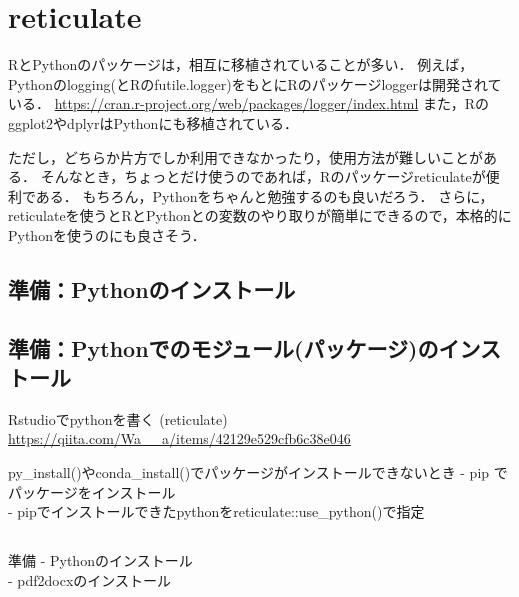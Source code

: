 \documentclass[
]{article}
\begin{document}
\hypertarget{reticulate}{%
\section{reticulate}\label{reticulate}}

RとPythonのパッケージは，相互に移植されていることが多い．
例えば，Pythonのlogging(とRのfutile.logger)をもとにRのパッケージloggerは開発されている．
\url{https://cran.r-project.org/web/packages/logger/index.html}
また，Rのggplot2やdplyrはPythonにも移植されている．

ただし，どちらか片方でしか利用できなかったり，使用方法が難しいことがある．
そんなとき，ちょっとだけ使うのであれば，Rのパッケージreticulateが便利である．
もちろん，Pythonをちゃんと勉強するのも良いだろう．
さらに，reticulateを使うとRとPythonとの変数のやり取りが簡単にできるので，本格的にPythonを使うのにも良さそう．

\hypertarget{ux6e96ux5099pythonux306eux30a4ux30f3ux30b9ux30c8ux30fcux30eb}{%
\subsection{準備：Pythonのインストール}\label{ux6e96ux5099pythonux306eux30a4ux30f3ux30b9ux30c8ux30fcux30eb}}

\hypertarget{ux6e96ux5099pythonux3067ux306eux30e2ux30b8ux30e5ux30fcux30ebux30d1ux30c3ux30b1ux30fcux30b8ux306eux30a4ux30f3ux30b9ux30c8ux30fcux30eb}{%
\subsection{準備：Pythonでのモジュール(パッケージ)のインストール}\label{ux6e96ux5099pythonux3067ux306eux30e2ux30b8ux30e5ux30fcux30ebux30d1ux30c3ux30b1ux30fcux30b8ux306eux30a4ux30f3ux30b9ux30c8ux30fcux30eb}}

Rstudioでpythonを書く (reticulate)
\url{https://qiita.com/Wa__a/items/42129e529cfb6c38e046}

py\_install()やconda\_install()でパッケージがインストールできないとき
- pip でパッケージをインストール\\
- pipでインストールできたpythonをreticulate::use\_python()で指定

\hypertarget{section-3}{%
\subsection{}\label{section-3}}

準備
- Pythonのインストール\\
- pdf2docxのインストール
\end{document}

